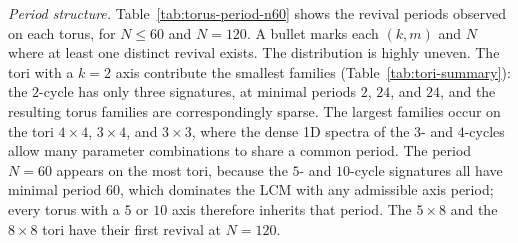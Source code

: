 \emph{Period structure.}
Table~\ref{tab:torus-period-n60} shows the revival periods observed
on each torus, for $N \le 60$ and $N = 120$. A bullet marks each $(k, m)$ and $N$
where at least one distinct revival exists. The distribution is
highly uneven. The tori with a $k = 2$ axis contribute the smallest
families (Table~\ref{tab:tori-summary}): the $2$-cycle has only
three signatures, at minimal periods $2$, $24$, and $24$, and the
resulting torus families are correspondingly sparse. The largest
families occur on the tori $4 \times 4$, $3 \times 4$, and
$3 \times 3$, where the dense 1D spectra of the $3$- and $4$-cycles
allow many parameter combinations to share a common period. The
period $N = 60$ appears on the most tori, because the $5$- and
$10$-cycle signatures all have minimal period $60$, which dominates
the LCM with any admissible axis period; every torus with a $5$ or
$10$ axis therefore inherits that period.  The $5 \times 8$ and the
$8 \times 8$ tori have their first revival at $N = 120$. 
